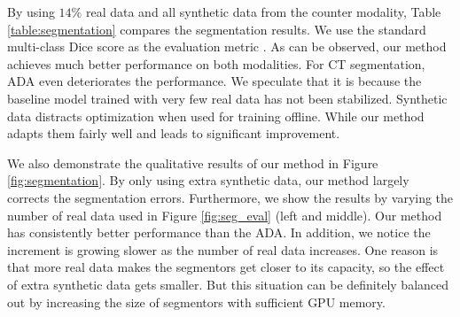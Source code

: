 \documentclass[10pt,twocolumn,letterpaper]{article}
\begin{document}
By using $14\%$  real data and all synthetic data from the counter modality, Table \ref{table:segmentation} compares the segmentation results. We use the standard multi-class Dice score as the evaluation metric \cite{dice1945measures}.
As can be observed, our method achieves much better performance on both modalities. For CT segmentation, ADA even deteriorates the performance.  We speculate that it is because the baseline model trained with very few real data has not been stabilized. Synthetic data distracts optimization when used for training offline. While our method adapts them fairly well and leads to significant improvement.

We also demonstrate the qualitative results of our method in Figure \ref{fig:segmentation}. By only using extra synthetic data, our method largely corrects the segmentation errors.
Furthermore, we show the results by varying the number of real data used in Figure \ref{fig:seg_eval} (left and middle). Our method has consistently better performance than the ADA. In addition, we notice the increment is growing slower as the number of real data increases. One reason is that more real data makes the segmentors get closer to its capacity, so the effect of extra synthetic data gets smaller. But this situation can be definitely balanced out by increasing the size of segmentors with sufficient GPU memory.  
\end{document}
